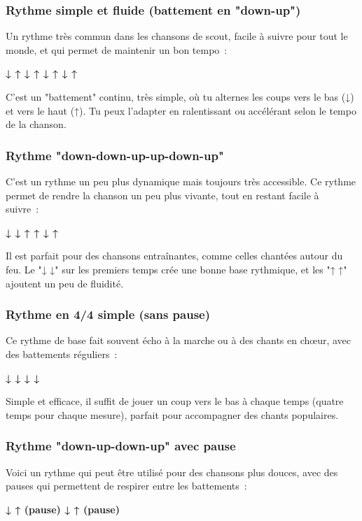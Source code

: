 \subsubsection*{Rythme simple et fluide (battement en "down-up")}

Un rythme très commun dans les chansons de scout, facile à suivre pour tout le monde, et qui permet de maintenir un bon tempo~:~

\textbf{↓ ↑ ↓ ↑ ↓ ↑ ↓ ↑}

C'est un "battement" continu, très simple, où tu alternes les coups vers le bas (↓) et vers le haut (↑). Tu peux l'adapter en ralentissant ou accélérant selon le tempo de la chanson.

\subsubsection*{Rythme "down-down-up-up-down-up"}

C'est un rythme un peu plus dynamique mais toujours très accessible. Ce rythme permet de rendre la chanson un peu plus vivante, tout en restant facile à suivre~:~

\textbf{↓ ↓ ↑ ↑ ↓ ↑}

Il est parfait pour des chansons entraînantes, comme celles chantées autour du feu. Le "↓ ↓" sur les premiers temps crée une bonne base rythmique, et les "↑ ↑" ajoutent un peu de fluidité.

\subsubsection*{Rythme en 4/4 simple (sans pause)}

Ce rythme de base fait souvent écho à la marche ou à des chants en chœur, avec des battements réguliers~:~

\textbf{↓ ↓ ↓ ↓}

Simple et efficace, il suffit de jouer un coup vers le bas à chaque temps (quatre temps pour chaque mesure), parfait pour accompagner des chants populaires.

\subsubsection*{Rythme "down-up-down-up" avec pause}

Voici un rythme qui peut être utilisé pour des chansons plus douces, avec des pauses qui permettent de respirer entre les battements~:~

\textbf{↓ ↑ (pause) ↓ ↑ (pause)}

